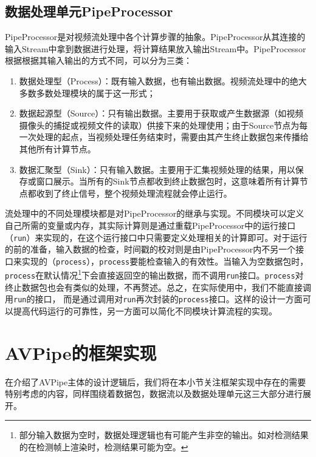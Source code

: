 \subsection{数据处理单元PipeProcessor}\label{ch4:design_proc}
PipeProcessor是对视频流处理中各个计算步骤的抽象。PipeProcessor从其连接的输入Stream中拿到数据进行处理，将计算结果放入输出Stream中。PipeProcessor根据根据其输入输出的方式不同，可以分为三类：
\begin{enumerate}
    \item 数据处理型（Process）：既有输入数据，也有输出数据。视频流处理中的绝大多数多数处理模块的属于这一形式；
    \item 数据起源型（Source）：只有输出数据。主要用于获取或产生数据源（如视频摄像头的捕捉或视频文件的读取）供接下来的处理使用；由于Source节点为每一次处理的起点，当视频处理任务结束时，需要由其产生终止数据包来传播给其他所有计算节点。
    \item 数据汇聚型（Sink）：只有输入数据。主要用于汇集视频处理的结果，用以保存或窗口展示。当所有的Sink节点都收到终止数据包时，这意味着所有计算节点都收到了终止信号，整个视频处理流程就会停止运行。
\end{enumerate}
流处理中的不同处理模块都是对PipeProcessor的继承与实现。不同模块可以定义自己所需的变量或内存，其实际计算则是通过重载PipeProcessor中的运行接口（\texttt{run}）来实现的，在这个运行接口中只需要定义处理相关的计算即可。对于运行的前的准备，输入数据的检查，时间戳的校对则是由PipeProcessor内不另一个接口来实现的（\texttt{process}），\texttt{process}要能检查输入的有效性。当输入为空数据包时，\texttt{process}在默认情况\footnote{部分输入数据为空时，数据处理逻辑也有可能产生非空的输出。如对检测结果的在检测帧上渲染时，检测结果可能为空。}下会直接返回空的输出数据，而不调用\texttt{run}接口。\texttt{process}对终止数据包也会有类似的处理，不再赘述。总之，在实际使用中，我们不能直接调用\texttt{run}的接口，
而是通过调用对\texttt{run}再次封装的\texttt{process}接口。这样的设计一方面可以提高代码运行的可靠性，另一方面可以简化不同模块计算流程的实现。

\section{AVPipe的框架实现}
在介绍了AVPipe主体的设计逻辑后，我们将在本小节关注框架实现中存在的需要特别考虑的内容，同样围绕着数据包，数据流以及数据处理单元这三大部分进行展开。
